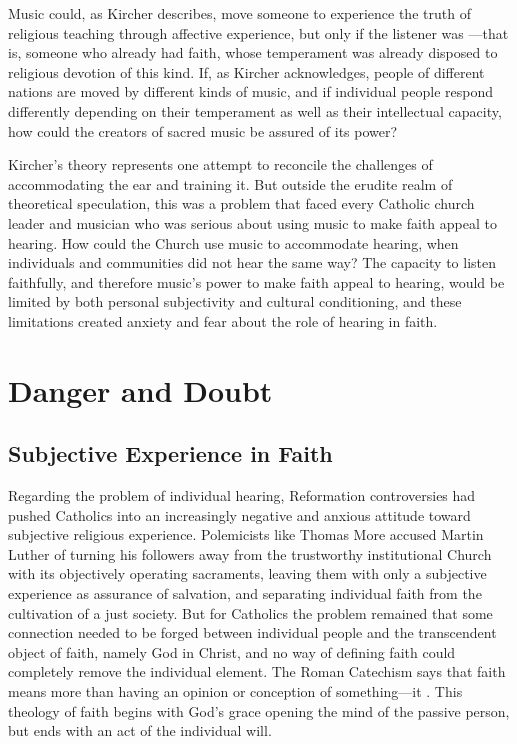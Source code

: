 Music could, as Kircher describes, move someone to experience the truth of religious teaching through affective experience, but only if the listener was ---that is, someone who already had faith, whose temperament was already disposed to religious devotion of this kind. 
If, as Kircher acknowledges, people of different nations are moved by different kinds of music, and if individual people respond differently depending on their temperament as well as their intellectual capacity, how could the creators of sacred music be assured of its power?

Kircher's theory represents one attempt to reconcile the challenges of accommodating the ear and training it. 
But outside the erudite realm of theoretical speculation, this was a problem that faced every Catholic church leader and musician who was serious about using music to make faith appeal to hearing.
How could the Church use music to accommodate hearing, when individuals and communities did not hear the same way? 
The capacity to listen faithfully, and therefore music's power to make faith appeal to hearing, would be limited by both personal subjectivity and cultural conditioning, and these limitations created anxiety and fear about the role of hearing in faith.

\section{Danger and Doubt}

\subsection{Subjective Experience in Faith}

Regarding the problem of individual hearing, Reformation controversies had pushed Catholics into an increasingly negative and anxious attitude toward subjective religious experience.
Polemicists like Thomas More accused Martin Luther of turning his followers away from the trustworthy institutional Church with its objectively operating sacraments, leaving them with only a subjective experience as assurance of salvation, and separating individual faith from the cultivation of a just society.%
    \Autocite[ch.~4]{Schreiner:Certainty}
But for Catholics the problem remained that some connection needed to be forged between individual people and the transcendent object of faith, namely God in Christ, and no way of defining faith could completely remove the individual element.
The Roman Catechism says that faith means more than having an opinion or conception of something---it .%
    \Autocite
    [15: .]
    {Catholic:Catechismus1614}
This theology of faith begins with God's grace opening the mind of the passive person, but ends with an act of the individual will.

